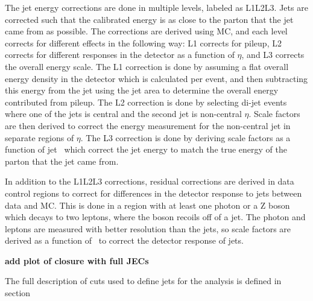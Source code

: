 The jet energy corrections are done in multiple levels, labeled as L1L2L3.
Jets are corrected such that the calibrated energy is as close to the parton that the jet came from as possible.
The corrections are derived using MC, and each level corrects for different effects in the following way:
L1 corrects for pileup,
L2 corrects for different responses in the detector as a function of $\eta$,
and L3 corrects the overall energy scale.
The L1 correction is done by assuming a flat overall energy density in the detector which is calculated per event,
and then subtracting this energy from the jet using the jet area to determine the overall energy contributed from pileup.
The L2 correction is done by selecting di-jet events where one of the jets is central and the second jet is non-central $\eta$.
Scale factors are then derived to correct the energy measurement for the non-central jet in separate regions of $\eta$.
The L3 correction is done by deriving scale factors as a function of jet \pt\ which correct the jet energy to match the true energy of the parton that the jet came from.

In addition to the L1L2L3 corrections, residual corrections are derived in data control regions to correct for differences in the detector response to jets between data and MC.
This is done in a region with at least one photon or a Z boson which decays to two leptons, where the boson recoils off of a jet.
The photon and leptons are measured with better resolution than the jets, so scale factors are derived as a function of \pt\ to correct the detector response of jets.

{\bf add plot of closure with full JECs}

The full description of cuts used to define jets for the analysis is defined in section 
